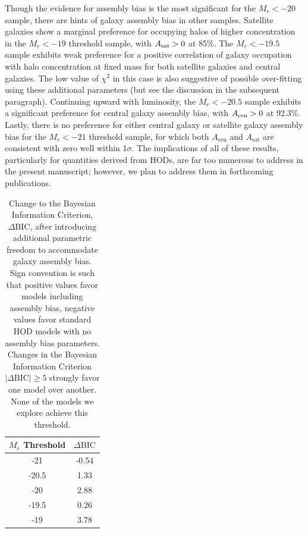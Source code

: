 \documentclass[usenatbib,usegraphicx,letterpaper]{mn2e}
\begin{document}
Though the evidence for assembly bias is the most significant for the $M_r<-20$ sample,
there are hints of galaxy assembly bias in other samples. Satellite galaxies show a marginal preference
for occupying halos of higher concentration in the $M_r < -19$ threshold sample, with $A_{\rm sat}>0$ at 
85\%. The $M_r < -19.5$ sample exhibits weak preference for a positive correlation of galaxy occupation 
with halo concentration at fixed mass for both satellite galaxies and central galaxies. The low value of 
$\chi^2$ in this case is also suggestive of possible over-fitting using these additional parameters (but see 
the discussion in the subsequent paragraph). Continuing upward with luminosity,
the $M_r < -20.5$ sample exhibits a significant preference for central galaxy assembly bias, 
with $A_{\rm cen}>0$ at 92.3\%. Lastly, there is no preference for either central galaxy or 
satellite galaxy assembly bias for the $M_r < -21$ threshold sample, 
for which both $A_{\mathrm{cen}}$ and $A_{\mathrm{sat}}$
are consistent with zero well within 1$\sigma$. The implications of all of these results, particularly for 
quantities derived from HODs, are far too numerous 
to address in the present manuscript; however, we plan to address them in forthcoming publications.

\begin{table}
\begin{center}
{\renewcommand{\arraystretch}{1.3}
\renewcommand{\tabcolsep}{0.2cm}
\begin{tabular}{c c}
\hline
\hline
$M_r$ Threshold & $\Delta \mathrm{BIC}$ \\
\hline
-21 & -0.54 \\
-20.5 & 1.33 \\
-20 & 2.88\\
-19.5 & 0.26\\
-19 & 3.78\\
\hline
\end{tabular}
\medskip
\caption{
Change to the Bayesian Information Criterion, $\Delta \mathrm{BIC}$,
after introducing additional parametric freedom to accommodate galaxy
assembly bias. Sign convention is such that positive values favor models including
assembly bias, negative values favor standard HOD models with no assembly bias parameters. Changes in
the Bayesian Information Criterion $\vert \Delta \mathrm{BIC}\vert \ge 5$ strongly favor one model
over another. None of the models we explore achieve this threshold.
}
 }
 \label{table:bic}
 \end{center}
\end{table}
\end{document}
